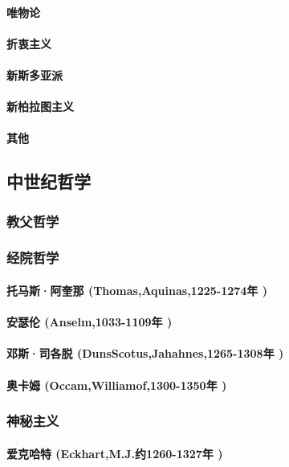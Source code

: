 \documentclass[UTF8]{../RepresentationUniverse}
\begin{document}
        \paragraph{唯物论}
        \paragraph{折衷主义}
        \paragraph{新斯多亚派}
        \paragraph{新柏拉图主义}
        \paragraph{其他}


\subsection{中世纪哲学}
\subsubsection{教父哲学}
\subsubsection{经院哲学}
    \paragraph{托马斯·阿奎那 (Thomas,Aquinas,1225-1274年 )}
    \paragraph{安瑟伦 (Anselm,1033-1109年 )}
    \paragraph{邓斯·司各脱 (DunsScotus,Jahahnes,1265-1308年 )}
    \paragraph{奥卡姆 (Occam,Williamof,1300-1350年 )}
\subsubsection{神秘主义}
    \paragraph{爱克哈特 (Eckhart,M.J.约1260-1327年 )}
\end{document}
